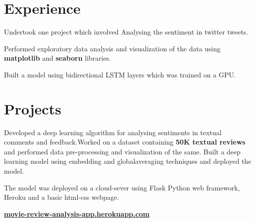 \documentclass[]{deedy-resume-reversed}
\begin{document}
%
%

%
%

%
%

\begin{minipage}[t]{0.59\textwidth}


\section{Experience}
\vspace{\topsep}
\begin{tightemize}
\large{\item Undertook one project which involved Analysing the sentiment in twitter tweets.
\item Performed exploratory data analysis and visualization of the data using \textbf{matplotlib} and \textbf{seaborn} libraries.
\item Built a model using bidirectional LSTM layers which was trained on a GPU.
}
\end{tightemize}
\sectionsep


\section{Projects}
\begin{tightemize}
\large{\item Developed a deep learning algorithm for analysing sentiments in textual comments and feedback.Worked on a dataset containing \textbf{50K textual reviews} and performed data pre-processing and visualization of the same. Built a deep learning model using embedding and globalaveraging techniques and deployed the model. \item The model was deployed on a cloud-sever using Flask Python web framework, Heroku and a basic html-css webpage. \item  \href{https://movie-review-analysis-app.herokuapp.com/}{\textbf{movie-review-analysis-app.herokuapp.com}}
}
\end{tightemize}
\sectionsep


\end{minipage}
\end{document}
